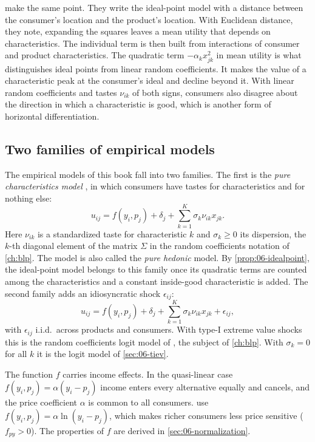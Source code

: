 \citet[eq.~6]{BerryPakes2007} make the same point. They write the ideal-point model with a distance
between the consumer's location and the product's location. With Euclidean distance, they note, expanding
the squares leaves a mean utility that depends on characteristics. The individual term is then built from
interactions of consumer and product characteristics. The quadratic term
$-\alpha_k x_{jk}^2$ in mean utility is what distinguishes ideal points from linear random coefficients.
It makes the value of a characteristic peak at the consumer's ideal and decline beyond it. With linear
random coefficients and tastes $\nu_{ik}$ of both signs, consumers also disagree about the direction in
which a characteristic is good, which is another form of horizontal differentiation.

\subsection{Two families of empirical models}\label{sec:06-classes}

The empirical models of this book fall into two families. The first is the \emph{pure characteristics
model} \citep{BerryPakes2007}, in which consumers have tastes for characteristics and for nothing else:
\begin{equation}\label{eq:06-pc-class}
  u_{ij} = f(y_i, p_j) + \delta_j + \sum_{k=1}^K \sigma_k \nu_{ik} x_{jk}.
\end{equation}
Here $\nu_{ik}$ is a standardized taste for characteristic $k$ and $\sigma_k \ge 0$ its dispersion, the
$k$-th diagonal element of the matrix $\Sigma$ in the random coefficients notation of \cref{ch:blp}. The
model is also called the \emph{pure hedonic} model. By \cref{prop:06-idealpoint}, the ideal-point model
belongs to this family once its quadratic terms are counted among the characteristics and a constant
inside-good characteristic is added. The second family adds an idiosyncratic shock $\epsilon_{ij}$:
\begin{equation}\label{eq:06-blp-class}
  u_{ij} = f(y_i, p_j) + \delta_j + \sum_{k=1}^K \sigma_k \nu_{ik} x_{jk} + \epsilon_{ij},
\end{equation}
with $\epsilon_{ij}$ i.i.d.\ across products and consumers. With type-I extreme value shocks this is the
random coefficients logit model of \citet{BerryLevinsohnPakes1995}, the subject of \cref{ch:blp}. With
$\sigma_k = 0$ for all $k$ it is the logit model of \cref{sec:06-tiev}.

The function $f$ carries income effects. In the quasi-linear case $f(y_i, p_j) = \alpha(y_i - p_j)$ income
enters every alternative equally and cancels, and the price coefficient $\alpha$ is common to all
consumers. \citet{BerryLevinsohnPakes1995} use $f(y_i, p_j) = \alpha\ln(y_i - p_j)$, which makes richer
consumers less price sensitive ($f_{py} > 0$). The properties of $f$ are derived in
\cref{sec:06-normalization}.

